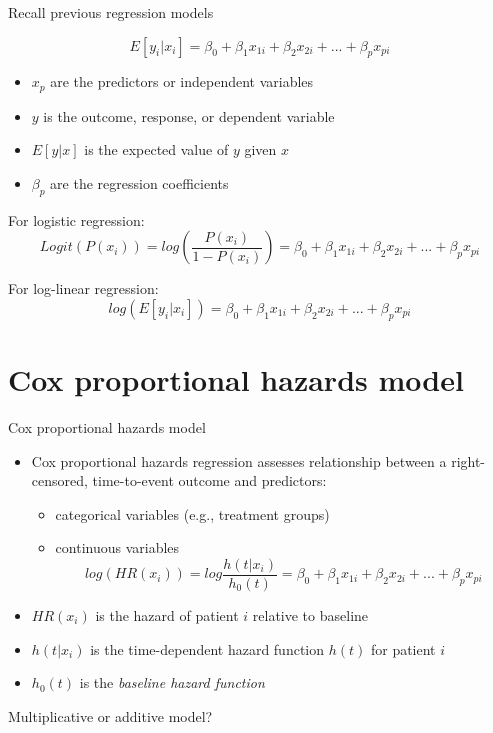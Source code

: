 \documentclass[
  ignorenonframetext,
]{beamer}
\providecommand{\tightlist}{%
  \setlength{\itemsep}{0pt}\setlength{\parskip}{0pt}}
\begin{document}
\begin{frame}{Recall previous regression models}
\protect\hypertarget{recall-previous-regression-models}{}

\[
E[y_i|x_i] = \beta_0 + \beta_1 x_{1i} + \beta_2 x_{2i} + ... + \beta_p x_{pi}
\]

\begin{itemize}
\tightlist
\item
  \(x_p\) are the predictors or independent variables
\item
  \(y\) is the outcome, response, or dependent variable
\item
  \(E[y|x]\) is the expected value of \(y\) given \(x\)
\item
  \(\beta_p\) are the regression coefficients
\end{itemize}

For logistic regression: \[
Logit(P(x_i)) = log \left( \frac{P(x_i)}{1-P(x_i)} \right) = \beta_0 + \beta_1 x_{1i} + \beta_2 x_{2i} + ... + \beta_p x_{pi}
\]

For log-linear regression: \[
log(E[y_i|x_i]) = \beta_0 + \beta_1 x_{1i} + \beta_2 x_{2i} + ... + \beta_p x_{pi}
\]

\end{frame}

\hypertarget{cox-proportional-hazards-model}{%
\section{Cox proportional hazards
model}\label{cox-proportional-hazards-model}}

\begin{frame}{Cox proportional hazards model}
\protect\hypertarget{cox-proportional-hazards-model-1}{}

\begin{itemize}
\tightlist
\item
  Cox proportional hazards regression assesses relationship between a
  right-censored, time-to-event outcome and predictors:

  \begin{itemize}
  \tightlist
  \item
    categorical variables (e.g., treatment groups)
  \item
    continuous variables \[
    log(HR(x_i)) = log \frac{h(t|x_i)}{h_0(t)} = \beta_0 + \beta_1 x_{1i} + \beta_2 x_{2i} + ... + \beta_p x_{pi}
    \]
  \end{itemize}
\item
  \(HR(x_i)\) is the hazard of patient \(i\) relative to baseline
\item
  \(h(t|x_i)\) is the time-dependent hazard function \(h(t)\) for
  patient \(i\)
\item
  \(h_0(t)\) is the \emph{baseline hazard function}
\end{itemize}

Multiplicative or additive model?

\end{frame}
\end{document}
